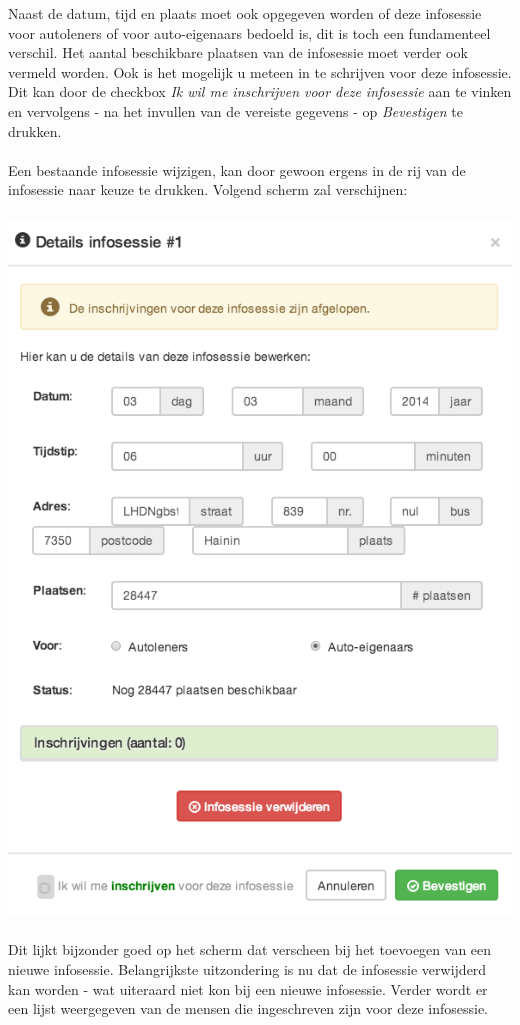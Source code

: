 \documentclass[11pt,a4paper,oneside]{article}
\begin{document}
Naast de datum, tijd en plaats moet ook opgegeven worden of deze infosessie voor autoleners of voor auto-eigenaars bedoeld is, dit is toch een fundamenteel verschil. Het aantal beschikbare plaatsen van de infosessie moet verder ook vermeld worden. Ook is het mogelijk u meteen in te schrijven voor deze infosessie. Dit kan door de checkbox \textit{Ik wil me inschrijven voor deze infosessie} aan te vinken en vervolgens - na het invullen van de vereiste gegevens - op \textit{Bevestigen} te drukken. \\\\
Een bestaande infosessie wijzigen, kan door gewoon ergens in de rij van de infosessie naar keuze te drukken. Volgend scherm zal verschijnen: \\\\
\includegraphics[scale=0.75]{img/detailsinfosessie} \\\\
Dit lijkt bijzonder goed op het scherm dat verscheen bij het toevoegen van een nieuwe infosessie. Belangrijkste uitzondering is nu dat de infosessie verwijderd kan worden - wat uiteraard niet kon bij een nieuwe infosessie. Verder wordt er een lijst weergegeven van de mensen die ingeschreven zijn voor deze infosessie.
\end{document}
